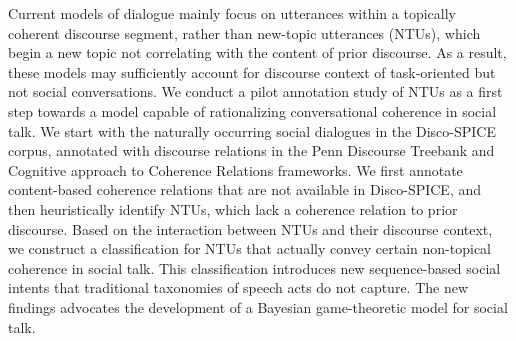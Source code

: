 Current models of dialogue mainly focus on utterances within a topically coherent discourse segment, rather than new-topic utterances (NTUs), which begin a new topic not correlating with the content of prior discourse. As a result, these models may sufficiently account for discourse context of task-oriented but not social conversations. We conduct a pilot annotation study of NTUs as a first step towards a model capable of rationalizing conversational coherence in social talk. We start with the naturally occurring social dialogues in the Disco-SPICE corpus, annotated with discourse relations in the Penn Discourse Treebank and Cognitive approach to Coherence Relations frameworks. We first annotate content-based coherence relations that are not available in Disco-SPICE, and then heuristically identify NTUs, which lack a coherence relation to prior discourse. Based on the interaction between NTUs and their discourse context, we construct a classification for NTUs that actually convey certain non-topical coherence in social talk. This classification introduces new sequence-based social intents that traditional taxonomies of speech acts do not capture. The new findings advocates the development of a Bayesian game-theoretic model for social talk.
